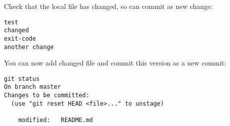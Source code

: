 \noindent Check that the local file has changed, so can commit as new change:

\begin{lstlisting}[language=ksh,caption={Changed file: README.md}]
test
changed
exit-code
another change
\end{lstlisting}

\noindent You can now add changed file and commit this version as a new commit:

\begin{lstlisting}[language=ksh]
git status
On branch master
Changes to be committed:
  (use "git reset HEAD <file>..." to unstage)

	modified:   README.md
\end{lstlisting}

% 
